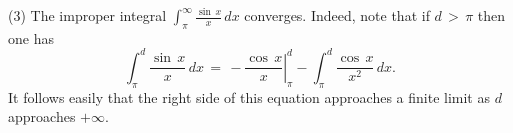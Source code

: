 {\V

        (3) The improper integral ${\displaystyle \int_{{\pi}}^{{\infty}} \frac{{\sin}\,x}{x}\,dx}$ converges.
    Indeed, note that if $d\,>\,{\pi}$ then one has
        \begin{displaymath}
        \int_{{\pi}}^{d} \frac{{\sin}\,x}{x}\,dx \,=\, -\left.\frac{{\cos}\,x}{x}\right|_{{\pi}}^{d} - \int_{{\pi}}^{d} \frac{{\cos}\,x}{x^{2}}\,dx.
        \end{displaymath}
    It follows easily that the right side of this equation approaches a finite limit as $d$ approaches $+{\infty}$.
%

}%

\newpage

%
%

